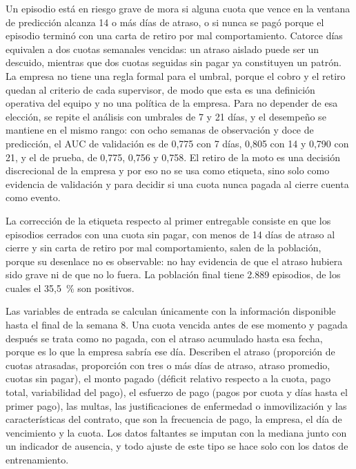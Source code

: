 \documentclass[journal]{IEEEtran}
\begin{document}
Un episodio está en riesgo grave de mora si alguna cuota que vence en la ventana de predicción alcanza 14 o más días de atraso, o si nunca se pagó porque el episodio terminó con una carta de retiro por mal comportamiento. Catorce días equivalen a dos cuotas semanales vencidas: un atraso aislado puede ser un descuido, mientras que dos cuotas seguidas sin pagar ya constituyen un patrón. La empresa no tiene una regla formal para el umbral, porque el cobro y el retiro quedan al criterio de cada supervisor, de modo que esta es una definición operativa del equipo y no una política de la empresa. Para no depender de esa elección, se repite el análisis con umbrales de 7 y 21 días, y el desempeño se mantiene en el mismo rango: con ocho semanas de observación y doce de predicción, el AUC de validación es de 0,775 con 7 días, 0,805 con 14 y 0,790 con 21, y el de prueba, de 0,775, 0,756 y 0,758. El retiro de la moto es una decisión discrecional de la empresa y por eso no se usa como etiqueta, sino solo como evidencia de validación y para decidir si una cuota nunca pagada al cierre cuenta como evento.

La corrección de la etiqueta respecto al primer entregable consiste en que los episodios cerrados con una cuota sin pagar, con menos de 14 días de atraso al cierre y sin carta de retiro por mal comportamiento, salen de la población, porque su desenlace no es observable: no hay evidencia de que el atraso hubiera sido grave ni de que no lo fuera. La población final tiene 2.889 episodios, de los cuales el 35,5~\% son positivos.

Las variables de entrada se calculan únicamente con la información disponible hasta el final de la semana 8. Una cuota vencida antes de ese momento y pagada después se trata como no pagada, con el atraso acumulado hasta esa fecha, porque es lo que la empresa sabría ese día. Describen el atraso (proporción de cuotas atrasadas, proporción con tres o más días de atraso, atraso promedio, cuotas sin pagar), el monto pagado (déficit relativo respecto a la cuota, pago total, variabilidad del pago), el esfuerzo de pago (pagos por cuota y días hasta el primer pago), las multas, las justificaciones de enfermedad o inmovilización y las características del contrato, que son la frecuencia de pago, la empresa, el día de vencimiento y la cuota. Los datos faltantes se imputan con la mediana junto con un indicador de ausencia, y todo ajuste de este tipo se hace solo con los datos de entrenamiento.

\end{document}
